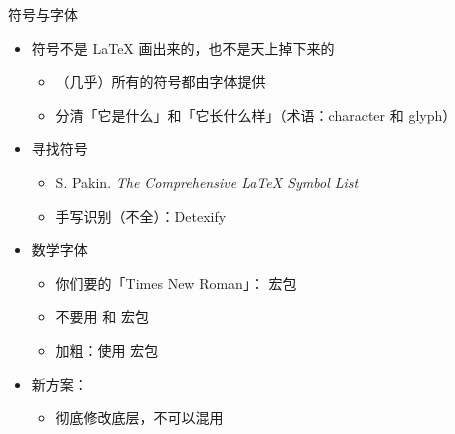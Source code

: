 \begin{frame}{符号与字体}
\begin{itemize}
  \item 符号不是 \LaTeX{} 画出来的，也不是天上掉下来的 \pause
    \begin{itemize}
      \item （几乎）所有的符号都由字体提供 \pause
      \item 分清「它是什么」和「它长什么样」（术语：character 和 glyph）
    \end{itemize} \pause
  \item 寻找符号
    \begin{itemize}
      \item S. Pakin. \emph{The Comprehensive \LaTeX{} Symbol List}
      \item 手写识别（不全）：Detexify 
    \end{itemize} \pause
  \item 数学字体
    \begin{itemize}
      \item 你们要的「Times New Roman」： 宏包
      \item \alert{不要用  和  宏包}
      \item 加粗：使用  宏包
    \end{itemize} \pause
  \item 新方案：
    \begin{itemize}
      \item 彻底修改底层，不可以混用
    \end{itemize}
\end{itemize}
\end{frame}

